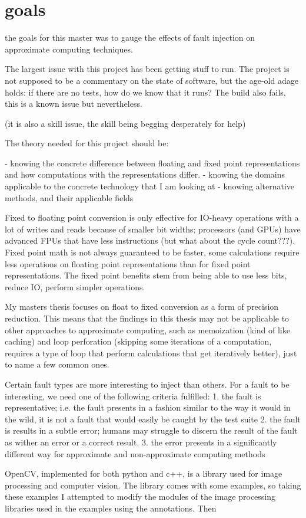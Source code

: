 \section{goals}

the goals for this master was to gauge the effects of fault injection on approximate computing techniques.

The largest issue with this project has been getting stuff to run. The project is not supposed to be a commentary on the state of software, but the age-old adage holds: if there are no tests, how do we know that it runs? The build also fails, this is a known issue but nevertheless.

(it is also a skill issue, the skill being begging desperately for help)

The theory needed for this project should be:

- knowing the concrete difference between floating and fixed point representations and how computations with the representations differ.
- knowing the domains applicable to the concrete technology that I am looking at
- knowing alternative methods, and their applicable fields





Fixed to floating point conversion is only effective for IO-heavy operations with a lot of writes and reads because of smaller bit widths; processors (and GPUs) have advanced FPUs that have less instructions (but what about the cycle count???). Fixed point math is not always guaranteed to be faster, some calculations require less operations on floating point representations than for fixed point representations. The fixed point benefits stem from being able to use less bits, reduce IO, perform simpler operations.

My masters thesis focuses on float to fixed conversion as a form of precision reduction. This means that the findings in this thesis may not be applicable to other approaches to approximate computing, such as memoization (kind of like caching) and loop perforation (skipping some iterations of a computation, requires a type of loop that perform calculations that get iteratively better), just to name a few common ones. 

Certain fault types are more interesting to inject than others. For a fault to be interesting, we need one of the following criteria fulfilled:
1. the fault is representative; i.e. the fault presents in a fashion similar to the way it would in the wild, it is not a fault that would easily be caught by the test suite
2. the fault is results in a subtle error; humans may struggle to discern the result of the fault as wither an error or a correct result. 
3. the error presents in a significantly different way for approximate and non-approximate computing methods


OpenCV, implemented for both python and c++, is a library used for image processing and computer vision.
The library comes with some examples, so taking these examples I attempted to modify the modules of the image processing libraries used in the examples using the \taffo annotations. Then


